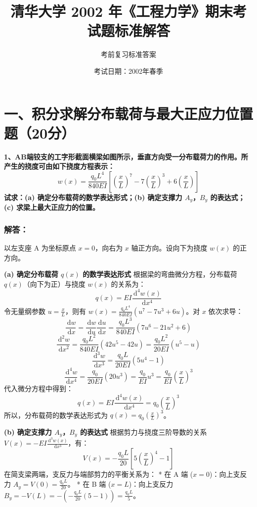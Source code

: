\documentclass[UTF8,fontset=windows]{ctexart}
\title{\vspace{-1.5cm}\textbf{清华大学 2002 年《工程力学》期末考试题标准解答}}
\author{考前复习标准答案}
\date{考试日期：2002年春季}
\newcommand{\diff}{\,\mathrm{d}}
\begin{document}
\maketitle
\vspace{-1.0cm}

\section*{一、积分求解分布载荷与最大正应力位置题（20分）}

\textbf{1、AB端铰支的工字形截面横梁如图所示，垂直方向受一分布载荷力的作用。所产生的挠度可由如下挠度方程表示：}
\[
    w(x) = \frac{q_0 L^4}{840 EI} \left[ \left(\frac{x}{L}\right)^7 - 7\left(\frac{x}{L}\right)^3 + 6\left(\frac{x}{L}\right) \right]
\]
\textbf{试求：(a) 确定分布载荷的数学表达形式；(b) 确定支撑力 $A_y$，$B_y$ 的表达式；(c) 求梁上最大正应力的位置。}

\subsubsection*{解答：}

以左支座 A 为坐标原点 $x = 0$，向右为 $x$ 轴正方向。设向下为挠度 $w(x)$ 的正方向。

\textbf{(a) 确定分布载荷 $q(x)$ 的数学表达形式}
根据梁的弯曲微分方程，分布载荷 $q(x)$（向下为正）与挠度 $w(x)$ 的关系为：
\[
    q(x) = EI \frac{\diff^4 w(x)}{\diff x^4}
\]
令无量纲参数 $u = \frac{x}{L}$，则有 $w(x) = \frac{q_0 L^4}{840 EI} (u^7 - 7u^3 + 6u)$。对 $x$ 依次求导：
\[
    \frac{\diff w}{\diff x} = \frac{\diff w}{\diff u} \frac{\diff u}{\diff x} = \frac{q_0 L^3}{840 EI} (7u^6 - 21u^2 + 6)
\]
\[
    \frac{\diff^2 w}{\diff x^2} = \frac{q_0 L^2}{840 EI} (42u^5 - 42u) = \frac{q_0 L^2}{20 EI} (u^5 - u)
\]
\[
    \frac{\diff^3 w}{\diff x^3} = \frac{q_0 L}{20 EI} (5u^4 - 1)
\]
\[
    \frac{\diff^4 w}{\diff x^4} = \frac{q_0}{20 EI} (20u^3) = \frac{q_0}{EI} u^3 = \frac{q_0}{EI} \left(\frac{x}{L}\right)^3
\]
代入微分方程中得到：
\[
    q(x) = EI \frac{\diff^4 w(x)}{\diff x^4} = q_0 \left(\frac{x}{L}\right)^3
\]
所以，分布载荷的数学表达形式为 $q(x) = q_0 \left(\frac{x}{L}\right)^3$。

\textbf{(b) 确定支撑力 $A_y$，$B_y$ 的表达式}
根据剪力与挠度三阶导数的关系 $V(x) = -EI \frac{\diff^3 w(x)}{\diff x^3}$，有：
\[
    V(x) = -\frac{q_0 L}{20} \left[ 5\left(\frac{x}{L}\right)^4 - 1 \right]
\]
在简支梁两端，支反力与端部剪力的平衡关系为：
*   在 A 端 ($x = 0$)：向上支反力 $A_y = V(0) = \frac{q_0 L}{20}$。
*   在 B 端 ($x = L$)：向上支反力 $B_y = -V(L) = -\left( -\frac{q_0 L}{20} (5 - 1) \right) = \frac{q_0 L}{5}$。
\end{document}
